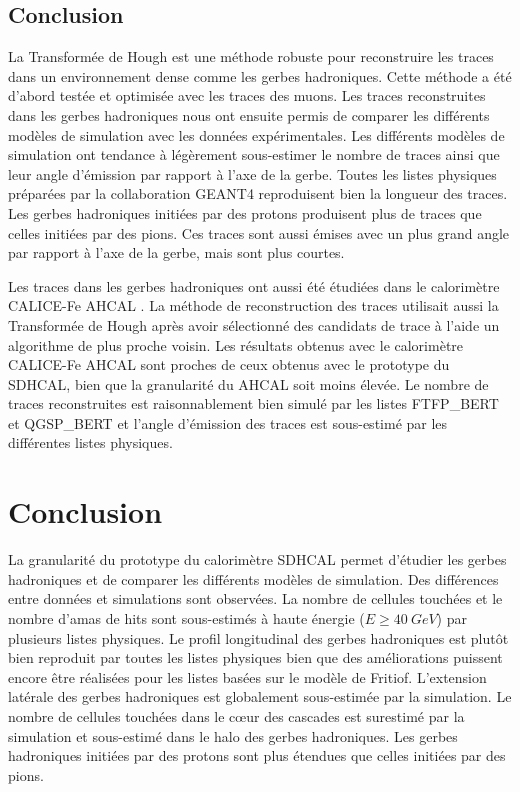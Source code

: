 \subsection{Conclusion}
La Transformée de Hough est une méthode robuste pour reconstruire les traces dans un environnement dense comme les gerbes hadroniques. Cette méthode a été d'abord testée et optimisée avec les traces des muons. Les traces reconstruites dans les gerbes hadroniques nous ont ensuite permis de comparer les différents modèles de simulation avec les données expérimentales. 
Les différents modèles de simulation ont tendance à légèrement sous-estimer le nombre de traces ainsi que leur angle d'émission par rapport à l'axe de la gerbe. Toutes les listes physiques préparées par la collaboration GEANT4 reproduisent bien la longueur des traces. Les gerbes hadroniques initiées par des protons produisent plus de traces que celles initiées par des pions. Ces traces sont aussi émises avec un plus grand angle par rapport à l'axe de la gerbe, mais sont plus courtes. 

Les traces dans les gerbes hadroniques ont aussi été étudiées dans le calorimètre CALICE-Fe AHCAL \cite{track-ahcal}. La méthode de reconstruction des traces utilisait aussi la Transformée de Hough après avoir sélectionné des candidats de trace à l'aide un algorithme de plus proche voisin. Les résultats obtenus avec le calorimètre CALICE-Fe AHCAL sont proches de ceux obtenus avec le prototype du SDHCAL, bien que la granularité du AHCAL soit moins élevée. Le nombre de traces reconstruites est raisonnablement bien simulé par les listes FTFP\_BERT et QGSP\_BERT et l'angle d'émission des traces est sous-estimé par les différentes listes physiques. %

\section{Conclusion}
La granularité du prototype du calorimètre SDHCAL permet d'étudier les gerbes hadroniques et de comparer les différents modèles de simulation. Des différences entre données et simulations sont observées. La nombre de cellules touchées et le nombre d'amas de hits sont sous-estimés à haute énergie ($E\geq40~GeV$) par plusieurs listes physiques. Le profil longitudinal des gerbes hadroniques est plutôt bien reproduit par toutes les listes physiques bien que des améliorations puissent encore être réalisées pour les listes basées sur le modèle de Fritiof. L'extension latérale des gerbes hadroniques est globalement sous-estimée par la simulation. Le nombre de cellules touchées dans le cœur des cascades est surestimé par la simulation et sous-estimé dans le halo des gerbes hadroniques. Les gerbes hadroniques initiées par des protons sont plus étendues que celles initiées par des pions. 

